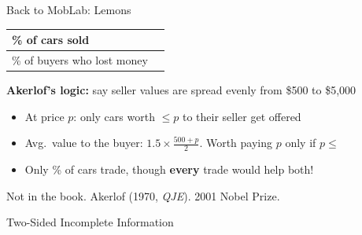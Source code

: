 \begin{frame}{Back to MobLab: Lemons}
\centering
\renewcommand{\arraystretch}{1.8}
\begin{tabular}{|l|c|}
\hline
\% of cars sold & \hspace{1in} \\
\hline
\% of buyers who lost money & \\
\hline
\end{tabular}
\bsk
\raggedright
\textbf{Akerlof's logic:} say seller values are spread evenly from \$500 to \$5{,}000
\begin{itemize}
    \item At price $p$: only cars worth $\le p$ to their seller get offered
    \item Avg.\ value to the buyer: $1.5\times\frac{500+p}{2}$. Worth paying $p$ only if $p\le$ \underline{\hspace{0.5in}}
    \item Only \underline{\hspace{0.4in}}\% of cars trade, though \textbf{every} trade would help both!
\end{itemize}
\vfill
{\footnotesize Not in the book. Akerlof (1970, \textit{QJE}). 2001 Nobel Prize.}
\vspace{-0.2in}
\end{frame}


\begin{frame}[standout]
Two-Sided Incomplete Information
\end{frame}

